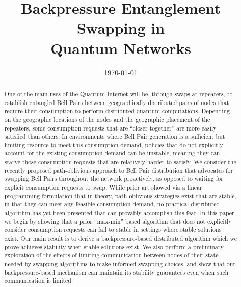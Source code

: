 \documentclass[11pt]{article}
\title{Backpressure Entanglement Swapping in \\ Quantum Networks}
\date{\today}
\begin{document}
\maketitle

\begin{abstract}
One of the main uses of the Quantum Internet will be, through swaps at repeaters, to establish entangled Bell Pairs between geographically distributed pairs of nodes that require their consumption to perform distributed quantum computations.  Depending on the geographic locations of the nodes and the geographic placement of the repeaters, some consumption requests that are ``closer together'' are more easily satisfied than others.  In environments where Bell Pair generation is a sufficient but limiting resource to meet this consumption demand, policies that do not explicitly account for the existing consumption demand can be unstable, meaning they can starve those consumption requests that are relatively harder to satisfy.  
%
We consider the recently proposed path-oblivious approach to Bell Pair distribution that advocates for swapping Bell Pairs throughout the network proactively, as opposed to waiting for explicit consumption requests to swap.  While prior art showed via a linear programming formulation that in theory, path-oblivious strategies exist that are stable, in that they can meet any feasible consumption demand, no practical distributed algorithm has yet been presented that can provably accomplish this feat.  In this paper, we begin by showing that a prior ``max-min'' based algorithm that does not explicitly consider consumption requests can fail to stable in settings where stable solutions exist.  Our main result is to derive a backpressure-based distributed algorithm which we prove achieves stability when stable solutions exist.  We also perform a preliminary exploration of the effects of limiting communication between nodes of their state needed by swapping algorithms to make informed swapping choices, and show that our backpressure-based mechanism can maintain its stability guarantees even when such communication is limited.



\end{abstract}
\end{document}
